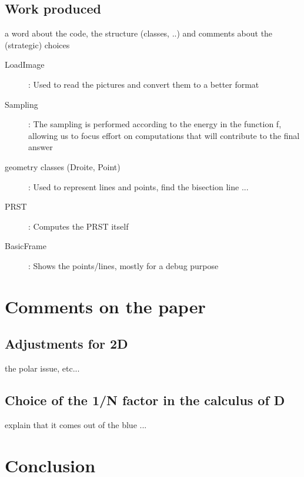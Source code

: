 \documentclass[10pt,a4paper]{article}			%
\begin{document}
	\subsection{Work produced}
	
	a word about the code, the structure (classes, ..) and comments about the (strategic) choices
	
	\begin{description}	
  \item[LoadImage]: Used to read the pictures and convert them to a better format
 \item[Sampling]: The sampling is performed according to the energy in the function f, allowing us
to focus effort on computations that will contribute to the final answer
 \item[geometry classes (Droite, Point)]: Used to represent lines and points, find the bisection line ...
 \item[PRST]: Computes the PRST itself
 \item[BasicFrame]: Shows the points/lines, mostly for a debug purpose
 \end{description}
	  
  	\section{Comments on the paper}

	\subsection{Adjustments for 2D}
	
the	polar issue, etc...
  	
  	\subsection{Choice of the 1/N factor in the calculus of D}
  	
  	explain that it comes out of the blue ...

	\section*{Conclusion}
		
\end{document}
